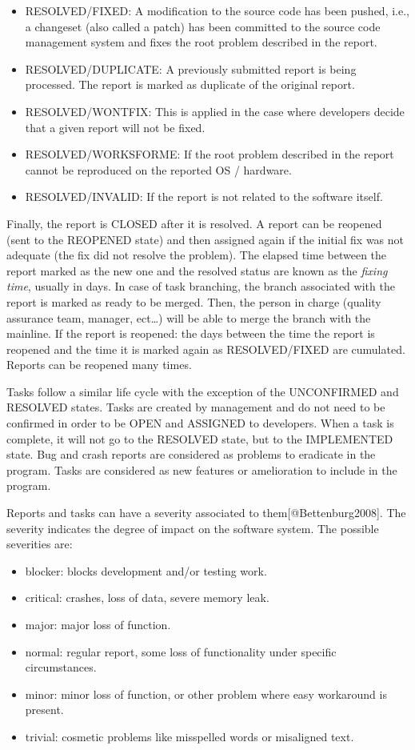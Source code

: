 \begin{itemize}
\item
  {RESOLVED/FIXED}: A modification to the source code has been pushed,
  i.e., a changeset (also called a patch) has been committed to the
  source code management system and fixes the root problem described in
  the report.
\item
  {RESOLVED/DUPLICATE}: A previously submitted report is being
  processed. The report is marked as duplicate of the original report.
\item
  {RESOLVED/WONTFIX}: This is applied in the case where developers
  decide that a given report will not be fixed.
\item
  {RESOLVED/WORKSFORME}: If the root problem described in the report
  cannot be reproduced on the reported OS / hardware.
\item
  {RESOLVED/INVALID}: If the report is not related to the software
  itself.
\end{itemize}

Finally, the report is {CLOSED} after it is resolved. A report can be
reopened (sent to the {REOPENED} state) and then assigned again if the
initial fix was not adequate (the fix did not resolve the problem). The
elapsed time between the report marked as the new one and the resolved
status are known as the {\emph{fixing time}}, usually in days. In case
of task branching, the branch associated with the report is marked as
ready to be merged. Then, the person in charge (quality assurance team,
manager, ect\ldots{}) will be able to merge the branch with the
mainline. If the report is reopened: the days between the time the
report is reopened and the time it is marked again as {RESOLVED/FIXED}
are cumulated. Reports can be reopened many times.

Tasks follow a similar life cycle with the exception of the
{UNCONFIRMED} and {RESOLVED} states. Tasks are created by management and
do not need to be confirmed in order to be {OPEN} and {ASSIGNED} to
developers. When a task is complete, it will not go to the {RESOLVED}
state, but to the {IMPLEMENTED} state. Bug and crash reports are
considered as problems to eradicate in the program. Tasks are considered
as new features or amelioration to include in the program.

Reports and tasks can have a severity associated to
them{[}@Bettenburg2008{]}. The severity indicates the degree of impact
on the software system. The possible severities are:

\begin{itemize}
\item
  blocker: blocks development and/or testing work.
\item
  critical: crashes, loss of data, severe memory leak.
\item
  major: major loss of function.
\item
  normal: regular report, some loss of functionality under specific
  circumstances.
\item
  minor: minor loss of function, or other problem where easy workaround
  is present.
\item
  trivial: cosmetic problems like misspelled words or misaligned text.
\end{itemize}

